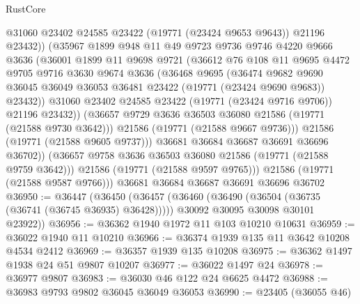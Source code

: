 \begin{lexlean}{RustCore}
\begin{coremodule}
                  @31060
                  @23402
                  @24585
                  @23422
                  (@19771 (@23424 @9653 @9643))
                  @21196
                  @23432))
              (@35967
                @1899
                @948
                @11
                @49
                @9723
                @9736
                @9746
                @4220
                @9666
                @3636
                (@36001
                  @1899
                  @11
                  @9698
                  @9721
                  (@36612
                    @76
                    @108
                    @11
                    @9695
                    @4472
                    @9705
                    @9716
                    @3630
                    @9674
                    @3636
                    (@36468
                      @9695
                      (@36474
                        @9682
                        @9690
                        @36045
                        @36049
                        @36053
                        @36481
                        @23422
                        (@19771 (@23424 @9690 @9683))
                        @23432))
                    @31060
                    @23402
                    @24585
                    @23422
                    (@19771 (@23424 @9716 @9706))
                    @21196
                    @23432))
                (@36657 @9729 @3636 @36503 @36080 @21586 (@19771 (@21588 @9730 @3642)))
                @21586
                (@19771 (@21588 @9667 @9736)))
              @21586
              (@19771 (@21588 @9605 @9737)))
            @36681
            @36684
            @36687
            @36691
            @36696
            @36702))
        (@36657 @9758 @3636 @36503 @36080 @21586 (@19771 (@21588 @9759 @3642)))
        @21586
        (@19771 (@21588 @9597 @9765)))
      @21586
      (@19771 (@21588 @9587 @9766)))
    @36681
    @36684
    @36687
    @36691
    @36696
    @36702
@36950 := @36447
    (@36450
      (@36457
        (@36460 (@36490 (@36504 (@36735 (@36741 (@36745 @36935) @36428)))))
        @30092
        @30095
        @30098
        @30101
        @23922))
@36956 := @36362 @1940 @1972 @11 @103 @10210 @10631
@36959 := @36022 @1940 @11 @10210
@36966 := @36374 @1939 @135 @11 @3642 @10208 @4534 @2412
@36969 := @36357 @1939 @135 @10208
@36975 := @36362 @1497 @1938 @24 @51 @9807 @10207
@36977 := @36022 @1497 @24
@36978 := @36977 @9807
@36983 := @36030 @46 @122 @24 @6625 @4472
@36988 := @36983 @9793 @9802 @36045 @36049 @36053
@36990 := @23405 (@36055 @46)

\end{coremodule}
\end{lexlean}

